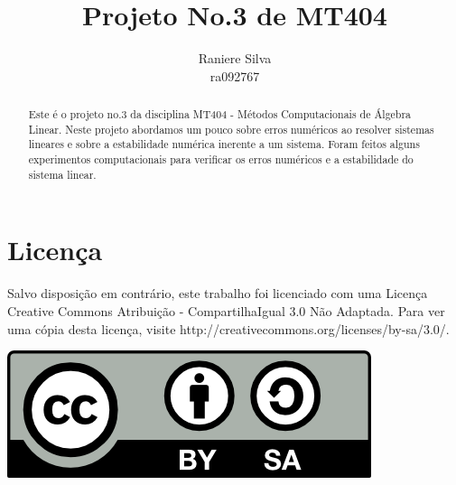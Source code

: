 \documentclass[12pt,a4paper]{article}
\begin{document}
\title{Projeto No.3 de MT404}
\author{Raniere Silva \\ ra092767}
\maketitle
\begin{abstract}
    Este \'{e} o projeto no.3 da disciplina MT404 - M\'{e}todos Computacionais
    de \'{A}lgebra Linear. Neste projeto abordamos um pouco sobre erros
    num\'{e}ricos ao resolver sistemas lineares e sobre a estabilidade
    num\'{e}rica inerente a um sistema. Foram feitos alguns experimentos
    computacionais para verificar os erros num\'{e}ricos e a estabilidade do
    sistema linear.
\end{abstract}
\tableofcontents
\lstlistoflistings
\section*{Licen\c{c}a}
Salvo disposi\c{c}\~{a}o em contr\'{a}rio, este trabalho foi licenciado com uma
Licen\c{c}a Creative Commons Atribui\c{c}\~{a}o - CompartilhaIgual 3.0 N\~{a}o
Adaptada. Para ver uma c\'{o}pia desta licen\c{c}a, visite
http://creativecommons.org/licenses/by-sa/3.0/.
\begin{center}
    \includegraphics{../figuras/cc-by-sa.png}
\end{center}
\newpage
\end{document}

